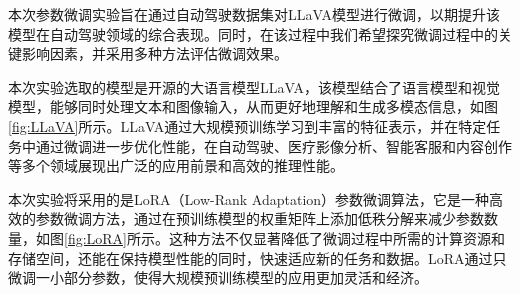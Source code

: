 \documentclass[
    linespread = 1.25
]{ctexart}
\begin{document}
本次参数微调实验旨在通过自动驾驶数据集对LLaVA模型进行微调，以期提升该模型在自动驾驶领域的综合表现。同时，在该过程中我们希望探究微调过程中的关键影响因素，并采用多种方法评估微调效果。

本次实验选取的模型是开源的大语言模型LLaVA\cite{liu2023llava}，该模型结合了语言模型和视觉模型，能够同时处理文本和图像输入，从而更好地理解和生成多模态信息，如图\ref{fig:LLaVA}所示。LLaVA通过大规模预训练学习到丰富的特征表示，并在特定任务中通过微调进一步优化性能，在自动驾驶、医疗影像分析、智能客服和内容创作等多个领域展现出广泛的应用前景和高效的推理性能。

本次实验将采用的是LoRA（Low-Rank Adaptation）参数微调算法\cite{hu2021loralowrankadaptationlarge}，它是一种高效的参数微调方法，通过在预训练模型的权重矩阵上添加低秩分解来减少参数数量，如图\ref{fig:LoRA}所示。这种方法不仅显著降低了微调过程中所需的计算资源和存储空间，还能在保持模型性能的同时，快速适应新的任务和数据。LoRA通过只微调一小部分参数，使得大规模预训练模型的应用更加灵活和经济。
\end{document}
